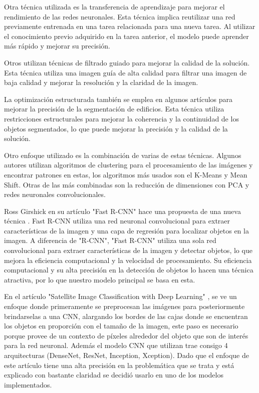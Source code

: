 \documentclass[article]{llncs}
\begin{document}
Otra técnica utilizada es la transferencia de aprendizaje para mejorar el rendimiento de las redes neuronales. Esta 
técnica implica reutilizar una red previamente entrenada en una tarea relacionada para una nueva tarea. 
Al utilizar el conocimiento previo adquirido en la tarea anterior, el modelo puede aprender más rápido y mejorar 
su precisión.

Otros utilizan técnicas de filtrado guiado para mejorar la calidad de la solución. Esta técnica utiliza una 
imagen guía de alta calidad para filtrar una imagen de baja calidad y mejorar la resolución y la claridad de la imagen.

La optimización estructurada también se emplea en algunos artículos para mejorar la precisión de la segmentación de 
edificios. Esta técnica utiliza restricciones estructurales para mejorar la coherencia y la continuidad de los 
objetos segmentados, lo que puede mejorar la precisión y la calidad de la solución.

Otro enfoque utilizado es la combinación de varias de estas técnicas. Algunos autores utilizan algoritmos de clustering 
para el procesamiento de las imágenes y encontrar patrones en estas, los algoritmos más usados son el K-Means y Mean Shift. Otras de las más combinadas 
son la reducción de dimensiones con PCA y redes neuronales convolucionales.

Ross Girshick en su artículo "Fast R-CNN" hace una propuesta de una nueva técnica \cite{FRCNN}. Fast R-CNN utiliza una red neuronal 
convolucional para extraer características de la imagen y una capa de regresión para localizar objetos en la imagen. 
A diferencia de "R-CNN", "Fast R-CNN" utiliza una sola red convolucional para extraer características de la imagen y 
detectar objetos, lo que mejora la eficiencia computacional y la velocidad de procesamiento. Su eficiencia computacional y su alta precisión en la detección de objetos 
lo hacen una técnica atractiva, por lo que nuestro modelo principal se basa en esta. 

En el artículo "Satellite Image Classification with Deep Learning" \cite{satelite}, se ve un enfoque donde primeramente se 
preprocesan las imágenes para posteriormente brindarselas a una CNN, alargando los bordes de las cajas donde se encuentran los objetos en proporción con el tamaño de 
la imagen, este paso es necesario porque provee de un contexto de píxeles alrededor del objeto que son de interés para la red 
neuronal. Además el modelo CNN que utilizan trae consigo 4 arquitecturas (DenseNet, ResNet, Inception, Xception). 
Dado que el enfoque de este artículo tiene una alta precisión en la problemática que se trata y está explicado con bastante claridad 
se decidió usarlo en uno de los modelos implementados.
\end{document}
